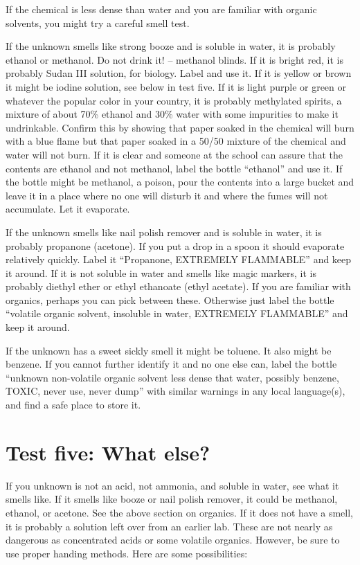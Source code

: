 If the chemical is less dense than water 
and you are familiar with organic solvents, 
you might try a careful smell test.

If the unknown smells like strong booze and is soluble in water, 
it is probably ethanol or methanol. 
Do not drink it! -- methanol blinds. 
If it is bright red, 
it is probably Sudan III solution, 
for biology. 
Label and use it. 
If it is yellow or brown it might be iodine solution, 
see below in test five. 
If it is light purple or green or whatever 
the popular color in your country, 
it is probably methylated spirits, 
a mixture of about 70\% ethanol and 30\% water
with some impurities to make it undrinkable. 
Confirm this by showing that paper soaked in the chemical 
will burn with a blue flame but that paper soaked in a 50/50 
mixture of the chemical and water will not burn. 
If it is clear and someone at the school can assure 
that the contents are ethanol and not methanol, 
label the bottle ``ethanol'' and use it. 
If the bottle might be methanol, 
a poison, 
pour the contents into a large bucket 
and leave it in a place where no one will disturb it 
and where the fumes will not accumulate. 
Let it evaporate.

If the unknown smells like nail polish remover 
and is soluble in water, 
it is probably propanone (acetone). 
If you put a drop in a spoon it should evaporate relatively quickly. 
Label it ``Propanone, 
EXTREMELY FLAMMABLE'' and keep it around. 
If it is not soluble in water and smells like magic markers, 
it is probably diethyl ether or ethyl ethanoate (ethyl acetate). 
If you are familiar with organics, 
perhaps you can pick between these. 
Otherwise just label the bottle ``volatile organic solvent, 
insoluble in water, 
EXTREMELY FLAMMABLE'' and keep it around.

If the unknown has a sweet sickly smell it might be toluene. 
It also might be benzene. 
If you cannot further identify it and no one else can, 
label the bottle ``unknown non-volatile organic solvent 
less dense that water, 
possibly benzene, 
TOXIC, 
never use, 
never dump'' with similar warnings in any local language(s), 
and find a safe place to store it.

\section{Test five: What else?}
\label{sec:whatelse}
If you unknown is not an acid, 
not ammonia, 
and soluble in water, 
see what it smells like. 
If it smells like booze or nail polish remover, 
it could be methanol, 
ethanol, 
or acetone. 
See the above section on organics. 
If it does not have a smell, 
it is probably a solution left over from an earlier lab. 
These are not nearly as dangerous as concentrated acids 
or some volatile organics. 
However, 
be sure to use proper handing methods. 
Here are some possibilities:

